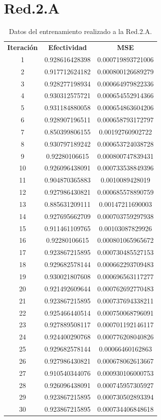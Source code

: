 \documentclass{iccmemoria}
\begin{document}
\section{Red.2.A}

\begin{longtable}{ccc} 
\caption{Datos del entrenamiento realizado a la Red.2.A.}\label{tab:training Red.2.A}\\

	\addlinespace
	\toprule
	\multicolumn{3}{c}{{\bf Entrenamiento Red.2.A}} \\
	\midrule
	{\bf Iteración} & {\bf Efectividad} & {\bf MSE} \\
	1 & 0.928616428398 & 0.000719893721006 \\
	2 & 0.917712624182 & 0.000800126689279 \\
	3 & 0.928277198934 & 0.000664979822336 \\
	4 & 0.930312575721 & 0.000654552914366 \\
	5 & 0.931184880058 & 0.000654863604206 \\
	6 & 0.928907196511 & 0.000658793172797 \\
	7 & 0.850399806155 & 0.00192760902722 \\
	8 & 0.930797189242 & 0.000653724038728 \\
	9 & 0.92280106615 & 0.000800747839431 \\
	10 & 0.926096438091 & 0.000733538849396 \\
	11 & 0.904870365883 & 0.0010089428019 \\
	12 & 0.927986430821 & 0.000685578890759 \\
	13 & 0.885631209111 & 0.00147211690003 \\
	14 & 0.927695662709 & 0.000703759297938 \\
	15 & 0.911461109765 & 0.00103087829926 \\
	16 & 0.92280106615 & 0.000801065965672 \\
	17 & 0.923867215895 & 0.000730485527153 \\
	18 & 0.929682578144 & 0.000662293709483 \\
	19 & 0.930021807608 & 0.000696563117277 \\
	20 & 0.921492609644 & 0.000762692770483 \\
	21 & 0.923867215895 & 0.000737694338211 \\
	22 & 0.925466440514 & 0.000750068796091 \\
	23 & 0.927889508117 & 0.000701192146117 \\
	24 & 0.924400290768 & 0.000776208040826 \\
	25 & 0.929682578144 & 0.00066460162863 \\
	26 & 0.927986430821 & 0.000678062613667 \\
	27 & 0.910540344076 & 0.000930106000753 \\
	28 & 0.926096438091 & 0.000745957305927 \\
	29 & 0.923867215895 & 0.000730502893394 \\
	30 & 0.923867215895 & 0.000734406848618 \\
	\bottomrule

\end{longtable}
\end{document}
